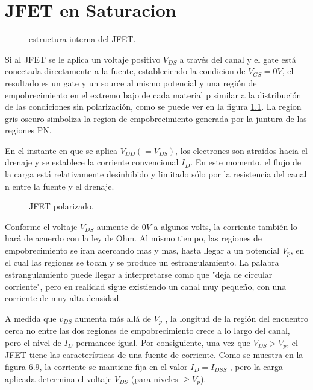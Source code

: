 \chapter{JFET en Saturacion}
  \begin{figure}
  \vspace{-1cm}
    \centering
    \resizebox{!}{\linewidth}{
    
    }
    \caption{estructura interna del JFET.}
    \label{fig:jfet.nopol}
  \end{figure}
  Si al JFET se le aplica un voltaje positivo $V_{DS}$ a través del canal y el gate está conectada directamente a la
  fuente, estableciendo la condicion de $V_{GS} = 0 V$, el resultado es un gate y un source al mismo potencial y una
  región de empobrecimiento en el extremo bajo de cada material p similar a la distribución de las condiciones sin
  polarización, como se puede ver en la figura \ref{fig:jfet.nopol}. La region gris oscuro simboliza la region de
  empobrecimiento generada por la juntura de las regiones PN.

  En el instante en que se aplica $V_{DD} (= V_{DS})$, los electrones son atraídos hacia el drenaje y se establece la
  corriente convencional $I_D$. En este momento, el flujo de la carga está relativamente desinhibido y limitado sólo
  por la resistencia del canal n entre la fuente y el drenaje.

  \begin{figure}
    \centering
    \resizebox{!}{\linewidth}{
    
    }
    \caption{JFET polarizado.}
    \label{fig:jfet.pol-corte}
  \end{figure}
  Conforme el voltaje $V_{DS}$ aumente de $0V$ a algunos volts, la corriente también lo hará de acuerdo con la ley de Ohm.
  Al mismo tiempo, las regiones de empobrecimiento se iran acercando mas y mas, hasta llegar a un potencial $V_p$, en el
  cual las regiones se tocan y se produce un estrangulamiento. La palabra estrangulamiento puede llegar a interpretarse
  como que "deja de circular corriente", pero en realidad sigue existiendo un canal muy pequeño, con una corriente de
  muy alta densidad.

  A medida que $v_{DS}$ aumenta más allá de $V_p$ , la longitud de la región del encuentro cerca no entre las dos
  regiones de empobrecimiento crece a lo largo del canal, pero el nivel de $I_D$ permanece igual. Por consiguiente, una
  vez que $V_{DS} > V_p$, el JFET tiene las características de una fuente de corriente. Como se muestra en la figura
  6.9, la corriente se mantiene fija en el valor $I_D = I_{DSS}$ , pero la carga aplicada determina el voltaje $V_{DS}$
  (para niveles $\geq V_p$).


